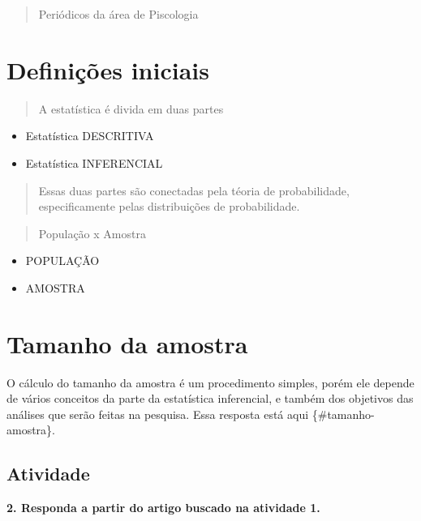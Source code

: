\documentclass[
]{book}
\begin{document}
\begin{quote}
Periódicos da área de Piscologia
\end{quote}

\hypertarget{definiuxe7uxf5es-iniciais}{%
\chapter{Definições iniciais}\label{definiuxe7uxf5es-iniciais}}

\begin{quote}
A estatística é divida em duas partes
\end{quote}

\begin{itemize}
\item
  Estatística DESCRITIVA
\item
  Estatística INFERENCIAL
\end{itemize}

\begin{quote}
Essas duas partes são conectadas pela téoria de probabilidade, especificamente pelas distribuições de probabilidade.
\end{quote}

\begin{quote}
População x Amostra
\end{quote}

\begin{itemize}
\item
  POPULAÇÃO
\item
  AMOSTRA
\end{itemize}

\hypertarget{tamanho-da-amostra}{%
\chapter{Tamanho da amostra}\label{tamanho-da-amostra}}

O cálculo do tamanho da amostra é um procedimento simples, porém ele depende de vários conceitos da parte da estatística inferencial, e também dos objetivos das análises que serão feitas na pesquisa. Essa resposta está aqui \{\#tamanho-amostra\}.

\hypertarget{atividade-1}{%
\section{Atividade}\label{atividade-1}}

\textbf{2. Responda a partir do artigo buscado na atividade 1.}
\end{document}
